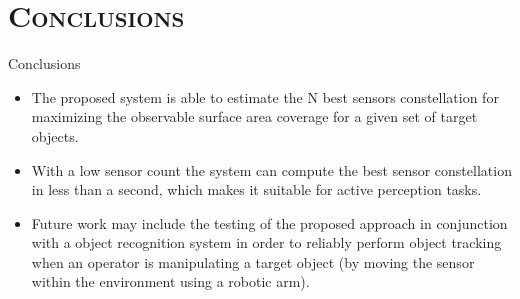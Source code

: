 \section{\scshape Conclusions}
\begin{frame}{Conclusions}
	\begin{itemize}
		\item The proposed system is able to estimate the N best sensors constellation for maximizing the observable surface area coverage for a given set of target objects.
		\item With a low sensor count the system can compute the best sensor constellation in less than a second, which makes it suitable for active perception tasks.
		\item Future work may include the testing of the proposed approach in conjunction with a object recognition system in order to reliably perform object tracking when an operator is manipulating a target object (by moving the sensor within the environment using a robotic arm).
	\end{itemize}
\end{frame}
